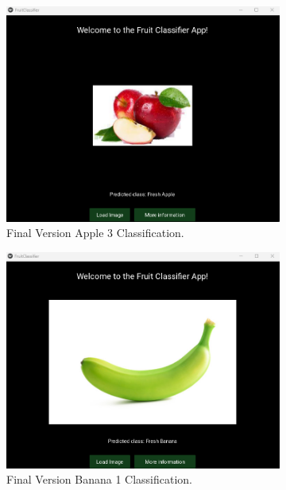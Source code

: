 \documentclass[conference]{IEEEtran}
\begin{document}
\begin{figure}[h]
    \hfill
    \begin{subfigure}[b]{0.48\linewidth}
        \centering
        \includegraphics[width=\linewidth]{Mlayer appel3.png}
        \caption{Final Version Apple 3 Classification.}
        \label{figFB}
    \end{subfigure}
    \hfill
    \begin{subfigure}[b]{0.48\linewidth}
        \centering
        \includegraphics[width=\linewidth]{Mlayer banana1.png}
        \caption{Final Version Banana 1 Classification.}
        \label{figFA}
    \end{subfigure}
    \hfill
    \begin{subfigure}[b]{0.48\linewidth}

\end{subfigure}
\end{figure}
\end{document}
